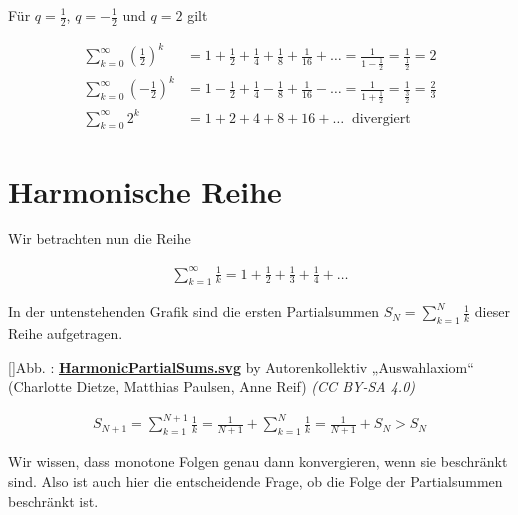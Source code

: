 \documentclass[fontsize=9pt,
               parskip=half-,
               DIV=14,
               listof=chapterentry,
               tocflat]{scrbook}
\newcounter{imagelabel}
\begin{document}
\begin{example*}
Für $q={\tfrac {1}{2}}$, $q=-{\tfrac {1}{2}}$ und $q=2$ gilt

\begin{align*}
\sum _{k=0}^{\infty }\left({\frac {1}{2}}\right)^{k}&=1+{\frac {1}{2}}+{\frac {1}{4}}+{\frac {1}{8}}+{\frac {1}{16}}+\ldots ={\frac {1}{1-{\frac {1}{2}}}}={\frac {1}{\frac {1}{2}}}=2\\[1em]\sum _{k=0}^{\infty }\left(-{\frac {1}{2}}\right)^{k}&=1-{\frac {1}{2}}+{\frac {1}{4}}-{\frac {1}{8}}+{\frac {1}{16}}-\ldots ={\frac {1}{1+{\frac {1}{2}}}}={\frac {1}{\frac {3}{2}}}={\frac {2}{3}}\\[1em]\sum _{k=0}^{\infty }2^{k}&=1+2+4+8+16+\ldots \ {\text{ divergiert}}
\end{align*}

\end{example*}

\chapter{Harmonische Reihe}

Wir betrachten nun die Reihe

\begin{align*}
\sum _{k=1}^{\infty }{\frac {1}{k}}=1+{\frac {1}{2}}+{\frac {1}{3}}+{\frac {1}{4}}+\ldots 
\end{align*}

In der untenstehenden Grafik sind die ersten Partialsummen $S_{N}=\sum _{k=1}^{N}{\frac {1}{k}}$ dieser Reihe aufgetragen.

[]{Abb. : \protect\href{https://commons.wikimedia.org/wiki/File:HarmonicPartialSums.svg}{\textbf{HarmonicPartialSums.svg}} by Autorenkollektiv „Auswahlaxiom“ (Charlotte Dietze, Matthias Paulsen, Anne Reif) \textit{(CC BY-SA 4.0)}}\begin{center}
\end{center}

\begin{align*}
S_{N+1}=\sum _{k=1}^{N+1}{\frac {1}{k}}={\frac {1}{N+1}}+\sum _{k=1}^{N}{\frac {1}{k}}={\frac {1}{N+1}}+S_{N}>S_{N}
\end{align*}

Wir wissen, dass monotone Folgen genau dann konvergieren, wenn sie beschränkt sind. Also ist auch hier die entscheidende Frage, ob die Folge der Partialsummen beschränkt ist.
\end{document}
